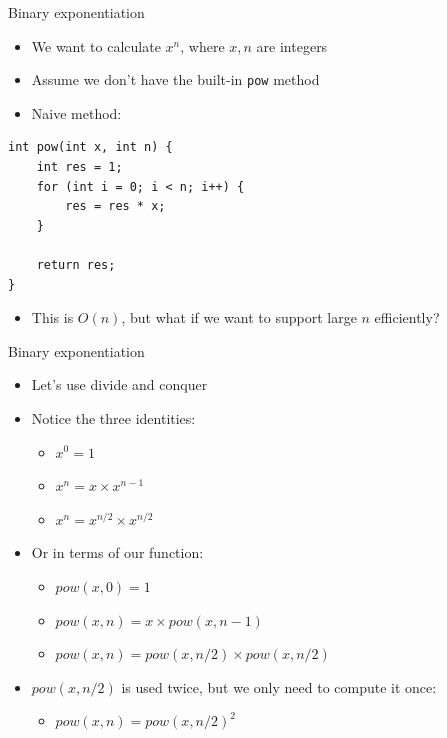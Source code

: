 \documentclass[10pt]{beamer}
\newcommand{\bi}{\begin{itemize}}
\newcommand{\ei}{\end{itemize}}
\begin{document}
\begin{frame}[fragile]{Binary exponentiation}
    \bi
        \item We want to calculate $x^n$, where $x,n$ are integers
        \item Assume we don't have the built-in \texttt{pow} method
        \item Naive method:
    \ei

    \begin{verbatim}
int pow(int x, int n) {
    int res = 1;
    for (int i = 0; i < n; i++) {
        res = res * x;
    }

    return res;
}
    \end{verbatim}

    \bi
        \item This is $O(n)$, but what if we want to support large $n$ efficiently?
    \ei
\end{frame}

\begin{frame}{Binary exponentiation}
    \bi
        \item Let's use divide and conquer
        \vspace{10pt}
        \item Notice the three identities:

            \bi
                \item $x^0 = 1$
                \item $x^n = x \times x^{n-1}$
                \item $x^n = x^{n/2} \times x^{n/2}$
            \ei

        \item Or in terms of our function:

            \bi
                \item $pow(x,0) = 1$
                \item $pow(x,n) = x \times pow(x, n-1)$
                \item $pow(x,n) = pow(x, n/2) \times pow(x, n/2)$
            \ei

        \item $pow(x,n/2)$ is used twice, but we only need to compute it once:

            \bi
                \item $pow(x,n) = pow(x, n/2)^2$
            \ei
    \ei
\end{frame}
\end{document}
